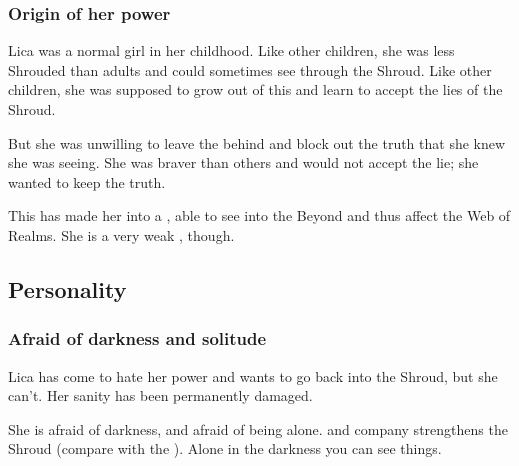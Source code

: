 \subsubsection{Origin of her power}
Lica was a normal girl in her childhood. 
Like other children, she was less Shrouded than adults and could sometimes see through the Shroud. 
Like other children, she was supposed to grow out of this and learn to accept the lies of the Shroud. 

But she was unwilling to leave the  behind and block out the truth that she knew she was seeing. 
She was braver than others and would not accept the lie; she wanted to keep the truth. 

This has made her into a \vertex, able to see into the Beyond and thus affect the Web of Realms. 
She is a very weak \vertex, though. 











\subsection{Personality}
\subsubsection{Afraid of darkness and solitude}
Lica has come to hate her power and wants to go back into the Shroud, but she can't. 
Her sanity has been permanently damaged. 

She is afraid of darkness, and afraid of being alone. 
 and company strengthens the Shroud (compare with the ). 
Alone in the darkness you can see things. 


